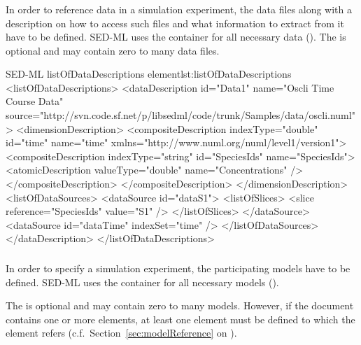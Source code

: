 \subsubsection{}
\label{sec:listOfDataDescriptions}
In order to reference data in a simulation experiment, the data files along with a description on how to access such files and what information to extract from it have to be defined. SED-ML uses the  container for all necessary data (). The  is optional and may contain zero to many data files.


\begin{myXmlLst}{SED-ML listOfDataDescriptions element}{lst:listOfDataDescriptions}
<listOfDataDescriptions>
	<dataDescription id="Data1" name="Oscli Time Course Data" source="http://svn.code.sf.net/p/libsedml/code/trunk/Samples/data/oscli.numl">
		<dimensionDescription>
			<compositeDescription indexType="double" id="time" name="time" xmlns="http://www.numl.org/numl/level1/version1">
        			<compositeDescription indexType="string" id="SpeciesIds" name="SpeciesIds">
         			<atomicDescription valueType="double" name="Concentrations" />
          		</compositeDescription>
      		</compositeDescription>
		</dimensionDescription>
		<listOfDataSources>
			<dataSource id="dataS1">
				<listOfSlices>
					<slice reference="SpeciesIds" value="S1" />
				</listOfSlices>
			</dataSource>
			<dataSource id="dataTime" indexSet="time" />
		</listOfDataSources>
	</dataDescription>
</listOfDataDescriptions>
\end{myXmlLst}


\subsubsection{}
\label{sec:listOfModels}
In order to specify a simulation experiment, the participating models have to be defined. SED-ML uses the  container for all necessary models (). 

The  is optional and may contain zero to many models. However, if the \currentLV document contains  one or more  elements, at least one  element must be defined to which the  element refers (c.f.\ Section~\ref{sec:modelReference} on ).

